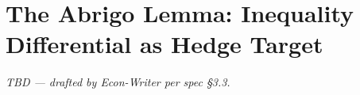 \section{The Abrigo Lemma: Inequality Differential as Hedge Target}\label{sec:3}

\textit{TBD --- drafted by Econ-Writer per spec \S3.3.}
